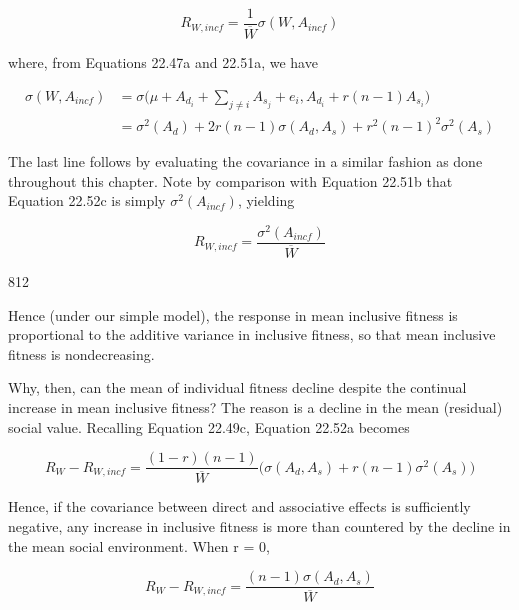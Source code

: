 \documentclass{article}
\begin{document}
\begin{equation}
R_{W,incf}=\frac{1}{\overline{W}}\sigma(W,A_{incf})
\tag{22.52b}
\label{eq:22_52b}
\end{equation}

where, from Equations 22.47a and 22.51a, we have

\begin{equation}
\begin{align*}\sigma(W,A_{incf})&=\sigma\Big(\mu+A_{d_{i}}+\sum_{j\neq i}A_{s_{j}}+e_{i},A_{d_{i}}+r(n-1)A_{s_{i}}\Big)\\&=\sigma^{2}(A_{d})+2r(n-1)\sigma(A_{d},A_{s})+r^{2}(n-1)^{2}\sigma^{2}(A_{s})\end{align*}
\tag{22.52c}
\label{eq:22_52c}
\end{equation}

The last line follows by evaluating the covariance in a similar fashion as done throughout this chapter. Note by comparison with Equation 22.51b that Equation 22.52c is simply  $ \sigma^{2}(A_{incf}) $, yielding

\begin{equation}
R_{W,incf}=\frac{\sigma^{2}(A_{incf})}{\overline{W}}
\tag{22.52d}
\label{eq:22_52d}
\end{equation}

812

Hence (under our simple model), the response in mean inclusive fitness is proportional to the additive variance in inclusive fitness, so that mean inclusive fitness is nondecreasing.

Why, then, can the mean of individual fitness decline despite the continual increase in mean inclusive fitness? The reason is a decline in the mean (residual) social value. Recalling Equation 22.49c, Equation 22.52a becomes

\begin{equation}
R_{W}-R_{W,i n c f}=\frac{(1-r)(n-1)}{\overline{W}}\Biggl(\sigma(A_{d},A_{s})+r(n-1)\sigma^{2}(A_{s})\Biggr)
\tag{22.52e}
\label{eq:22_52e}
\end{equation}

Hence, if the covariance between direct and associative effects is sufficiently negative, any increase in inclusive fitness is more than countered by the decline in the mean social environment. When r = 0,

\begin{equation}
R_{W}-R_{W,incf}=\frac{(n-1)\sigma(A_{d},A_{s})}{\overline{W}}
\tag{22.52f}
\label{eq:22_52f}
\end{equation}
\end{document}
